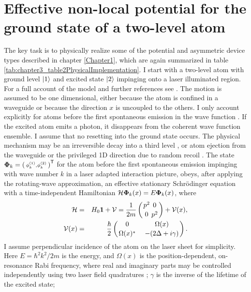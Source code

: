 \section{Effective non-local potential for the ground state of a two-level atom\label{sec:chapter3_enl}}
%
The key task is to physically realize some of the potential and asymmetric device types described in chapter \ref{Chapter1}, which are again summarized in table \ref{tab:chapter3_table2PhysicalImplementation}. I start with a two-level atom with ground level $\ket{1}$ and excited state $\ket{2}$ impinging onto a laser illuminated region. For a full account of the model and further references see
\cite{Ruschhaupt2009}. The motion is assumed to be one dimensional, either because the atom is confined in a waveguide or because the direction $x$ is uncoupled to
the others.
I only account explicitly for atoms before the first spontaneous emission in the wave function
\cite{Hegerfeldt1996,Damborenea2002,Navarro2003}.
If the excited atom emits a photon, it disappears from the coherent wave function ensemble.
I assume that no resetting into the ground state occurs. The physical mechanism
may be an irreversible decay into a third level  \cite{Oberthaler1996}, or atom ejection from the waveguide or the privileged 1D direction due to  random recoil  \cite{Streed2006}.
The state ${\bf\Phi}_k=\left(\begin{smallmatrix}\phi_k^{(1)},\phi_k^{(2)}\end{smallmatrix}\right)^{\sf T}$
for the atom before the first spontaneous emission impinging with wave number $k$
in a laser adapted  interaction picture,
obeys, after applying the rotating-wave approximation, an effective stationary Schr\"{o}dinger equation
with a time-independent Hamiltonian \cite{Ruschhaupt2004a,Ruschhaupt2009}
%
${\cal H}{\bf\Phi}_k(x)=E{\bf\Phi}_k(x)$,
%
where
%
\begin{eqnarray}
  {\cal H}&=& H_0{\bf 1}+ {\cal V}=\frac{1}{2m}\left(
  {{p}^2\atop 0}{0\atop {p}^2}\right)+ {\cal V}(x),
  \\
  {\cal V}(x) &=&
  \frac{\hbar}{2}\left(
  {0\atop \Omega(x)^*}\;\;\;\;
  {\Omega(x)\atop -(2\Delta+i\gamma)}
  \right).
\end{eqnarray}
%
I assume perpendicular incidence of the atom on the laser sheet for simplicity. Here $E=\hbar^2 k^2/2m$ is the energy, and
$\Omega(x)$ is the position-dependent, on-resonance Rabi frequency, where real and imaginary parts may be controlled independently
using two  laser field quadratures  \cite{Zhang2013};
$\gamma$ is the inverse of the lifetime of the excited state;
